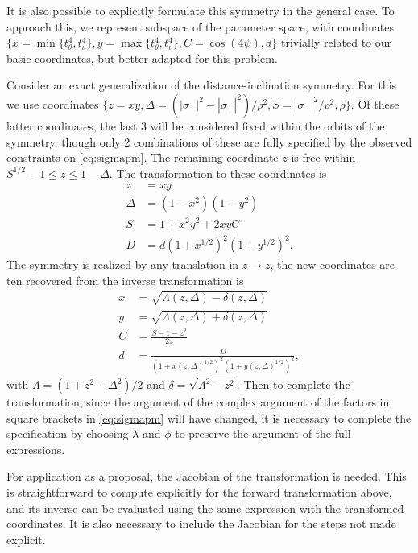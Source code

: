 \documentclass[aps,showpacs,twocolumn,prd,superscriptaddress,nofootinbib]{revtex4}
\begin{document}
It is also possible to explicitly formulate this symmetry in the general case.
To approach this, we represent subspace of the parameter space, with coordinates $\{x=\min\{t^4_\theta,t^4_\iota\},y=\max\{t^4_\theta,t^4_\iota\},C=\cos(4\psi),d\}$ trivially related to our basic coordinates, but better adapted for this problem.

Consider an exact generalization of the distance-inclination symmetry. For this we use coordinates $\{z=xy,\Delta=(|\sigma_-|^2-|\sigma_+|^2)/\rho^2,S=|\sigma_-|^2/\rho^2,\rho\}$.  Of these latter coordinates, the last 3 will be considered fixed within the orbits of the symmetry, though only 2 combinations of these are fully specified by the observed constraints on \eqref{eq:sigmapm}. The remaining coordinate $z$ is free within $S^{1/2}-1\leq z\leq 1-\Delta$. The transformation to these coordinates is
\begin{align}
  z&=xy\\
  \Delta&=(1-x^2)(1-y^2)\\
  S&=1+x^2y^2+2xyC\\
  D&=d(1+x^{1/2})^2(1+y^{1/2})^2.
\end{align}
The symmetry is realized by any translation in $z\rightarrow z$, the new coordinates are ten recovered from the inverse transformation is 
\begin{align}
  x&=\sqrt{\Lambda(z,\Delta)-\delta(z,\Delta)}\\
  y&=\sqrt{\Lambda(z,\Delta)+\delta(z,\Delta)}\\
  C&=\frac{S-1-z^2}{2z}\\
  d&=\frac D{(1+x(z,\Delta)^{1/2})^2(1+y(z,\Delta)^{1/2})^2},
\end{align}
with $\Lambda=(1+z^2-\Delta^2)/2$ and $\delta=\sqrt{\Lambda^2-z^2}$.
Then to complete the transformation, since the argument of the complex argument of the factors in square brackets in \eqref{eq:sigmapm} will have changed, it is necessary to complete the specification by choosing $\lambda$ and $\phi$ to preserve the argument of the full expressions.

For application as a proposal, the Jacobian of the transformation is needed.  This is straightforward to compute explicitly for the forward transformation above, and its inverse can be evaluated using the same expression with the transformed coordinates.  It is also necessary to include the Jacobian for the steps not made explicit.
\end{document}
